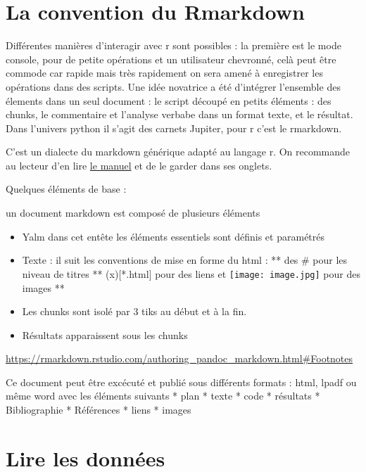 \documentclass[
]{book}
\providecommand{\tightlist}{%
  \setlength{\itemsep}{0pt}\setlength{\parskip}{0pt}}
\begin{document}
\hypertarget{la-convention-du-rmarkdown}{%
\section{La convention du Rmarkdown}\label{la-convention-du-rmarkdown}}

Différentes manières d'interagir avec r sont possibles : la première est le mode console, pour de petite opérations et un utilisateur chevronné, celà peut être commode car rapide mais très rapidement on sera amené à enregistrer les opérations dans des scripts. Une idée novatrice a été d'intégrer l'ensemble des élements dans un seul document : le script découpé en petits éléments : des chunks, le commentaire et l'analyse verbabe dans un format texte, et le résultat. Dans l'univers python il s'agit des carnets Jupiter, pour r c'est le rmarkdown.

C'est un dialecte du markdown générique adapté au langage r. On recommande au lecteur d'en lire \href{https://bookdown.org/yihui/rmarkdown/}{le manuel} et de le garder dans ses onglets.

Quelques éléments de base :

un document markdown est composé de plusieurs éléments

\begin{itemize}
\tightlist
\item
  Yalm dans cet entête les éléments essentiels sont définis et paramétrés
\item
  Texte : il suit les conventions de mise en forme du html :
  ** des \# pour les niveau de titres
  ** (x){[}*.html{]} pour des liens et \texttt{[image: image.jpg]} pour des images
  **
\item
  Les chunks sont isolé par 3 tiks au début et à la fin.
\item
  Résultats apparaissent sous les chunks
\end{itemize}

\url{https://rmarkdown.rstudio.com/authoring_pandoc_markdown.html\#Footnotes}

Ce document peut être excécuté et publié sous différents formats : html, lpadf ou même word avec les éléments suivants
* plan
* texte
* code
* résultats
* Bibliographie
* Références
* liens
* images

\hypertarget{lire-les-donnuxe9es}{%
\section{Lire les données}\label{lire-les-donnuxe9es}}
\end{document}
